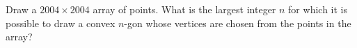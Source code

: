 Draw a $2004 \times 2004$ array of points. What is the largest integer $n$ for which it is possible to draw a convex $n$-gon whose vertices are chosen from the points in the array?